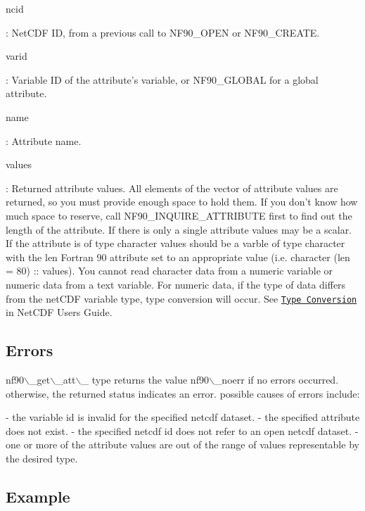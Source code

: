 {\ttfamily ncid}

\+: Net\+C\+DF ID, from a previous call to N\+F90\+\_\+\+O\+P\+EN or N\+F90\+\_\+\+C\+R\+E\+A\+TE.

{\ttfamily varid}

\+: Variable ID of the attribute’s variable, or N\+F90\+\_\+\+G\+L\+O\+B\+AL for a global attribute.

{\ttfamily name}

\+: Attribute name.

{\ttfamily values}

\+: Returned attribute values. All elements of the vector of attribute values are returned, so you must provide enough space to hold them. If you don’t know how much space to reserve, call N\+F90\+\_\+\+I\+N\+Q\+U\+I\+R\+E\+\_\+\+A\+T\+T\+R\+I\+B\+U\+TE first to find out the length of the attribute. If there is only a single attribute values may be a scalar. If the attribute is of type character values should be a varble of type character with the len Fortran 90 attribute set to an appropriate value (i.\+e. character (len = 80) \+:\+: values). You cannot read character data from a numeric variable or numeric data from a text variable. For numeric data, if the type of data differs from the net\+C\+DF variable type, type conversion will occur. See \href{netcdf.html#Type-Conversion}{\tt Type Conversion} in Net\+C\+DF Users Guide.

\subsection*{Errors}


\begin{DoxyCode}
nf90\(\backslash\)\_get\(\backslash\)\_att\(\backslash\)\_ \textcolor{keyword}{type} returns the \textcolor{keywordtype}{value} nf90\(\backslash\)\_noerr \textcolor{keywordflow}{if} no errors
occurred. otherwise, the returned status indicates an error. possible
causes of errors include:

-   the variable id is invalid for the specified netcdf dataset.
-   the specified attribute does not exist.
-   the specified netcdf id does not refer to an \textcolor{keyword}{open} netcdf dataset.
-   one or more of the attribute values are out of the range of values
    representable by the desired type.
\end{DoxyCode}


\subsection*{Example}

